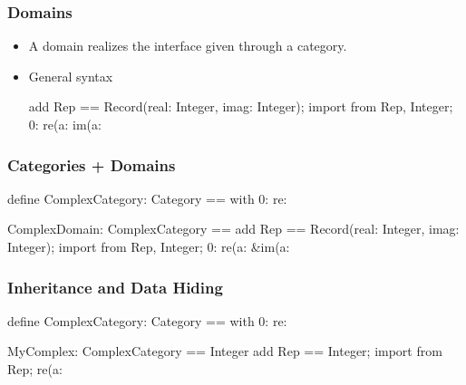 \begin{frame}[fragile]
\frametitle{Domains}
\begin{itemize}
\item A domain realizes the interface given through a category.
\item General syntax
\begin{myverbatim}
add {
  Rep == Record(real: Integer, imag: Integer);
  import from Rep, Integer;
  0: %
  re(a: %
  im(a: %
}
\end{myverbatim}
\end{itemize}
\end{frame}



















\begin{frame}[fragile]
\frametitle{Categories + Domains}
\begin{myverbatim}
define ComplexCategory: Category == with {
  0: %
  re: %
}

ComplexDomain: ComplexCategory == add {
  Rep == Record(real: Integer, imag: Integer);
  import from Rep, Integer;
  0: %
  re(a: %
  &im(a: %
}
\end{myverbatim}
\end{frame}



















\begin{frame}[fragile]
\frametitle{Inheritance and Data Hiding}
\begin{myverbatim}
define ComplexCategory: Category == with {
  0: %
  re: %
}

MyComplex: ComplexCategory == Integer add {
  Rep == Integer;
  import from Rep;
  re(a: %
}  
\end{myverbatim}
\end{frame}




















